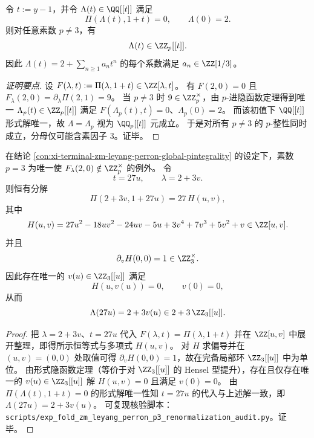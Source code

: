 \begin{conclusion}\label{con:xi-terminal-zm-leyang-perron-global-pintegrality}
令 \(t:=y-1\)，并令 \(\Lambda(t)\in\QQ[[t]]\) 满足
\[
\Pi(\Lambda(t),1+t)=0,\qquad \Lambda(0)=2.
\]
则对任意素数 \(p\neq 3\)，有
\[
\Lambda(t)\in\ZZ_p[[t]].
\]
因此 \(\Lambda(t)=2+\sum_{n\ge 1}a_n t^n\) 的每个系数满足 \(a_n\in\ZZ[1/3]\)。
\end{conclusion}
\begin{proof}[证明要点]
设 \(F(\lambda,t):=\Pi(\lambda,1+t)\in\ZZ[\lambda,t]\)。
有 \(F(2,0)=0\) 且
\(
F_{\lambda}(2,0)=\partial_{\lambda}\Pi(2,1)=9
\)。
当 \(p\neq 3\) 时 \(9\in\ZZ_p^\times\)，由 \(p\)-进隐函数定理得到唯一
\(
\Lambda_p(t)\in\ZZ_p[[t]]
\)
满足 \(F(\Lambda_p(t),t)=0\)、\(\Lambda_p(0)=2\)。
而该初值下 \(\QQ[[t]]\) 形式解唯一，故 \(\Lambda=\Lambda_p\) 视为 \(\QQ_p[[t]]\) 元成立。
于是对所有 \(p\neq 3\) 的 \(p\)-整性同时成立，分母仅可能含素因子 \(3\)。证毕。
\end{proof}

\begin{theorem}[\texorpdfstring{$p=3$}{p=3} 的 \(27\)-尺度良约化与 \(3\)-进 Hensel 可解性]\label{thm:xi-terminal-zm-leyang-perron-p3-renormalization-hensel}
在结论 \ref{con:xi-terminal-zm-leyang-perron-global-pintegrality} 的设定下，素数 \(p=3\) 为唯一使 \(F_\lambda(2,0)\notin\ZZ_p^\times\) 的例外。
令
\[
t=27u,\qquad \lambda=2+3v.
\]
则恒有分解
\[
\Pi(2+3v,1+27u)=27\,H(u,v),
\]
其中
\[
H(u,v)=27u^{2}-18uv^{2}-24uv-5u+3v^{4}+7v^{3}+5v^{2}+v\in\ZZ[u,v].
\]
并且
\[
\partial_v H(0,0)=1\in\ZZ_3^\times.
\]
因此存在唯一的 \(v(u)\in\ZZ_3[[u]]\) 满足
\[
H(u,v(u))=0,\qquad v(0)=0,
\]
从而
\[
\Lambda(27u)=2+3v(u)\in 2+3\,\ZZ_3[[u]].
\]
\end{theorem}
\begin{proof}
把 \(\lambda=2+3v\)、\(t=27u\) 代入 \(F(\lambda,t)=\Pi(\lambda,1+t)\) 并在 \(\ZZ[u,v]\) 中展开整理，即得所示恒等式与多项式 \(H(u,v)\)。
对 \(H\) 求偏导并在 \((u,v)=(0,0)\) 处取值可得 \(\partial_vH(0,0)=1\)，故在完备局部环 \(\ZZ_3[[u]]\) 中为单位。
由形式隐函数定理（等价于对 \(\ZZ_3[[u]]\) 的 Hensel 型提升），存在且仅存在唯一的 \(v(u)\in\ZZ_3[[u]]\) 解 \(H(u,v)=0\) 且满足 \(v(0)=0\)。
由 \(\Pi(\Lambda(t),1+t)=0\) 的形式解唯一性知 \(t=27u\) 的代入与上述解一致，即 \(\Lambda(27u)=2+3v(u)\)。
可复现核验脚本：\texttt{scripts/exp\_fold\_zm\_leyang\_perron\_p3\_renormalization\_audit.py}。证毕。
\end{proof}

